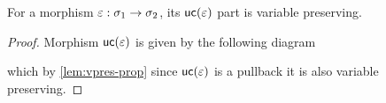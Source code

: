 \begin{lemma}\label{lem:con-fact-is-vpres}
    For a morphism $\varepsilon : \sigma_1 \to \sigma_2$, its $\mathsf{uc}(\varepsilon)$ part is variable preserving.
\end{lemma}
\begin{proof}
    Morphism $\mathsf{uc}(\varepsilon)$ is given by the following diagram
    \begin{center}
    \end{center}
    which by \cref{lem:vpres-prop} since $\mathsf{uc}(\varepsilon)$ is a pullback it is also variable preserving.
\end{proof}

